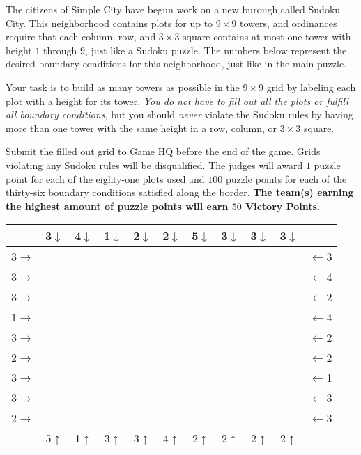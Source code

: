 \begin{extraPuzzle}
The citizens of Simple City have begun work on a new burough called
Sudoku City. This neighborhood contains plots for up to \(9\times 9\) towers,
and ordinances require that each column, row, and \(3\times 3\) square
contains at most one tower with height \(1\) through \(9\), just like a
Sudoku puzzle. The numbers below
represent the desired boundary conditions for this neighborhood, just like
in the main puzzle.

Your task is to build as many towers as possible in the \(9\times 9\) grid
by labeling each plot with a height for its tower.
\textit{You do not have to fill
out all the plots or fulfill all boundary conditions},
but you should \textit{never} violate the Sudoku rules by having
more than one tower with the same height in a row, column, or \(3\times 3\)
square.

Submit the filled out grid to Game HQ before the
end of the game. Grids violating any Sudoku rules will be disqualified.
The judges will award \(1\) puzzle point for each of the eighty-one
plots used and
\(100\) puzzle points for each of the thirty-six boundary conditions
satisfied along the border.
\textbf{The team(s) earning the highest amount of puzzle points
will earn \(50\) Victory Points.}


\begin{center}\Large
\begin{tabular}{c||c|c|c||c|c|c||c|c|c||c}
  & 3\(\downarrow\) & 4\(\downarrow\) & 1\(\downarrow\) & 2\(\downarrow\) & 2\(\downarrow\) & 5\(\downarrow\) & 3\(\downarrow\) & 3\(\downarrow\) & 3\(\downarrow\) &   \\\hline\hline
3\(\rightarrow\) &   &   &   &   &   &   &   &   &   & \(\leftarrow\)3 \\\hline
3\(\rightarrow\) &   &   &   &   &   &   &   &   &   & \(\leftarrow\)4 \\\hline
3\(\rightarrow\) &   &   &   &   &   &   &   &   &   & \(\leftarrow\)2 \\\hline\hline
1\(\rightarrow\) &   &   &   &   &   &   &   &   &   & \(\leftarrow\)4 \\\hline
3\(\rightarrow\) &   &   &   &   &   &   &   &   &   & \(\leftarrow\)2 \\\hline
2\(\rightarrow\) &   &   &   &   &   &   &   &   &   & \(\leftarrow\)2 \\\hline\hline
3\(\rightarrow\) &   &   &   &   &   &   &   &   &   & \(\leftarrow\)1 \\\hline
3\(\rightarrow\) &   &   &   &   &   &   &   &   &   & \(\leftarrow\)3 \\\hline
2\(\rightarrow\) &   &   &   &   &   &   &   &   &   & \(\leftarrow\)3 \\\hline\hline
  & 5\(\uparrow\) & 1\(\uparrow\) & 3\(\uparrow\) & 3\(\uparrow\) & 4\(\uparrow\) & 2\(\uparrow\) & 2\(\uparrow\) & 2\(\uparrow\) & 2\(\uparrow\) &
\end{tabular}
\end{center}
\end{extraPuzzle}



